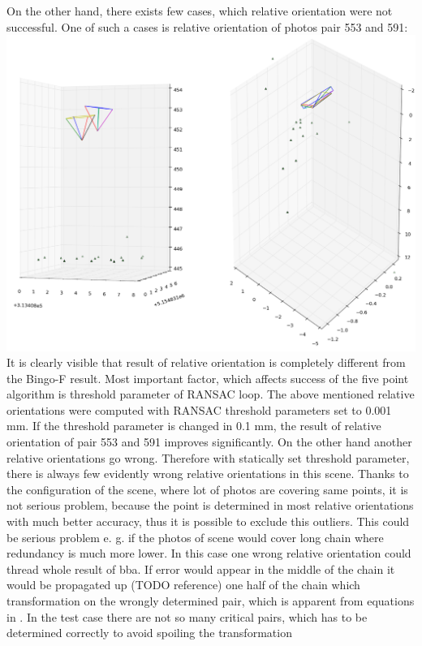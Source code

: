 \documentclass[a4paper,12pt]{report}
\begin{document}
On the other hand, there exists  few cases, which relative orientation were not successful.  
One of such a cases is relative orientation of photos pair 553 and 591:  
\includegraphics[scale=0.4]{figures/rel_or_553_591.png}
It is clearly visible that result of relative orientation is completely different from the Bingo-F result.
Most important factor, which affects success of the five point algorithm is threshold parameter of RANSAC loop.
The above mentioned relative orientations were computed with RANSAC threshold parameters set to 0.001 mm.
If the threshold parameter is changed in 0.1 mm, the result of relative orientation of pair 553 and 591 improves significantly.
On the other hand another relative orientations go wrong. Therefore with statically set threshold parameter, there is always 
few evidently wrong relative orientations in this scene. Thanks to the configuration of the scene, where lot of photos are 
covering same points, it is  not serious problem, because the point is determined in most relative orientations  with 
much better accuracy, thus it is possible to exclude this outliers. This could be serious problem e. g. if the photos 
of scene would cover long chain where redundancy is much more lower.   
In this case one wrong relative orientation could thread whole result of bba. If error would appear in the middle 
of the chain it would  be propagated up  (TODO reference) one half of the chain which transformation on the wrongly
determined pair, which is apparent from equations in \label{eq:comm_rel}. 
In the test case there are not so many critical pairs, which has to be determined correctly to avoid spoiling the transformation 
\end{document}
